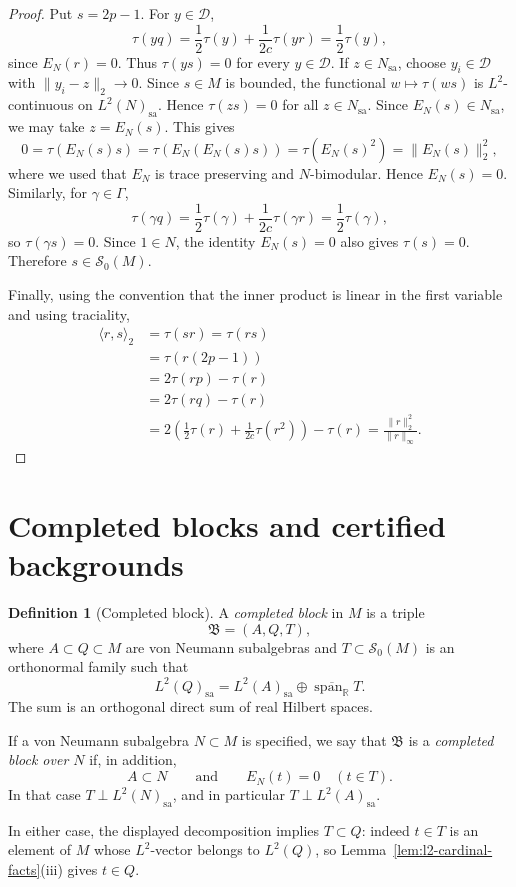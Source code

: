 \documentclass[11pt,letterpaper,reqno]{amsart}
\theoremstyle{definition}
\newtheorem{defin}[thm]{Definition}
\numberwithin{equation}{section}
\newcommand{\sa}{\mathrm{sa}}
\newcommand{\RR}{\mathbb R}
\newcommand{\one}{1}
\DeclareMathOperator{\spanop}{span}
\begin{document}
\begin{proof}
Put $s=2p-\one$.  For $y\in\mathcal D$,
\[
   \tau(yq)=\frac12\tau(y)+\frac{1}{2c}\tau(yr)=\frac12\tau(y),
\]
since $E_N(r)=0$. Thus $\tau(ys)=0$ for every $y\in\mathcal D$.  If
$z\in N_{\sa}$, choose $y_i\in\mathcal D$ with
$\|y_i-z\|_2\to0$.  Since $s\in M$ is bounded, the functional
$w\mapsto\tau(ws)$ is $L^2$-continuous on $L^2(N)_{\sa}$.  Hence
$\tau(zs)=0$ for all $z\in N_{\sa}$. Since \(E_N(s)\in N_{\sa}\), we may take \(z=E_N(s)\).  This gives
\[
0=\tau(E_N(s)s)
  =\tau(E_N(E_N(s)s))
  =\tau(E_N(s)^2)
  =\|E_N(s)\|_2^2,
\]
where we used that \(E_N\) is trace preserving and \(N\)-bimodular.  Hence
\(E_N(s)=0\).  Similarly, for \(\gamma\in\Gamma\),
\[
   \tau(\gamma q)=\frac12\tau(\gamma)+\frac{1}{2c}\tau(\gamma r)
   =\frac12\tau(\gamma),
\]
so \(\tau(\gamma s)=0\).  Since \(\one\in N\), the identity \(E_N(s)=0\)
also gives \(\tau(s)=0\).  Therefore \(s\in\mathcal S_0(M)\).

Finally, using the convention that the inner product is linear in the first
variable and using traciality,
\[
\begin{aligned}
   \langle r,s\rangle_2
   &=\tau(sr)
     =\tau(rs) \\
   &=\tau(r(2p-\one)) \\
   &=2\tau(rp)-\tau(r) \\
   &=2\tau(rq)-\tau(r) \\
   &=2\left(\frac12\tau(r)+\frac{1}{2c}\tau(r^2)\right)-\tau(r)
     =\frac{\|r\|_2^2}{\|r\|_\infty}.
\end{aligned}
\]
\end{proof}

\section{Completed blocks and certified backgrounds}\label{sec:certified-backgrounds}

\begin{defin}[Completed block]\label{def:block}
A \emph{completed block} in $M$ is a triple
\[
   \mathfrak B=(A,Q,T),
\]
where $A\subset Q\subset M$ are von Neumann subalgebras and
$T\subset\mathcal S_0(M)$ is an orthonormal family such that
\[
   L^2(Q)_{\sa}
   =
   L^2(A)_{\sa}\oplus\overline{\spanop_{\RR}}T .
\]
The sum is an orthogonal direct sum of real Hilbert spaces.

If a von Neumann subalgebra $N\subset M$ is specified, we say that
$\mathfrak B$ is a \emph{completed block over $N$} if, in addition,
\[
   A\subset N
   \qquad\text{and}\qquad
   E_N(t)=0\quad(t\in T).
\]
In that case $T\perp L^2(N)_{\sa}$, and in particular
$T\perp L^2(A)_{\sa}$.

In either case, the displayed decomposition implies $T\subset Q$: indeed
$t\in T$ is an element of $M$ whose $L^2$-vector belongs to $L^2(Q)$, so
Lemma~\ref{lem:l2-cardinal-facts}(iii) gives $t\in Q$.
\end{defin}
\end{document}
